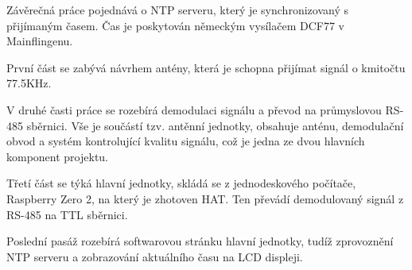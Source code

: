 Závěrečná práce pojednává o NTP serveru, který je synchronizovaný s přijímaným časem. Čas
je poskytován německým vysílačem DCF77 v Mainflingenu.

První část se zabývá návrhem antény, která je schopna přijímat signál o kmitočtu 77.5KHz.

V druhé časti práce se rozebírá demodulaci signálu a převod na průmyslovou RS-485
sběrnici. Vše je součástí tzv. antěnní jednotky, obsahuje anténu, demodulační obvod a systém kontrolující kvalitu
signálu, což je jedna ze dvou hlavních komponent projektu.

Třetí část se týká hlavní jednotky, skládá se z jednodeskového počítače, Raspberry Zero 2,
na který je zhotoven HAT. Ten převádí demodulovaný signál z RS-485 na TTL sběrnici.

Poslední pasáž rozebírá softwarovou stránku hlavní jednotky, tudíž zprovoznění NTP
serveru a zobrazování aktuálního času na LCD displeji.

